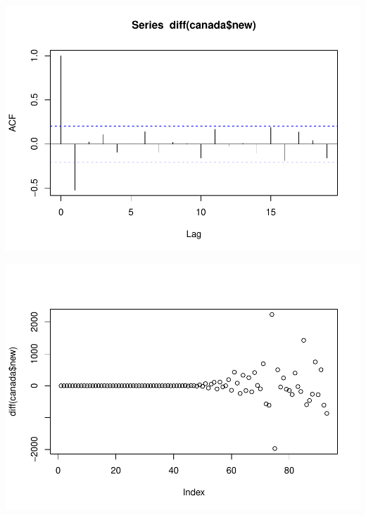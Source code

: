 \documentclass[]{article}
\newenvironment{Shaded}{\begin{snugshade}}{\end{snugshade}}
\newcommand{\KeywordTok}[1]{\textcolor[rgb]{0.13,0.29,0.53}{\textbf{#1}}}
\newcommand{\NormalTok}[1]{#1}
\newcommand{\OperatorTok}[1]{\textcolor[rgb]{0.81,0.36,0.00}{\textbf{#1}}}
\begin{document}
\begin{Shaded}
\end{Shaded}

\includegraphics{Covid19Canada_files/figure-latex/unnamed-chunk-3-2.pdf}

\begin{Shaded}
\end{Shaded}

\includegraphics{Covid19Canada_files/figure-latex/unnamed-chunk-3-3.pdf}
\end{document}
